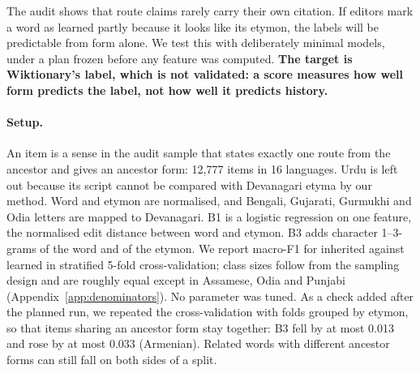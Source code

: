 \documentclass[11pt]{article}
\begin{document}
The audit shows that route claims rarely carry their own citation. If editors mark a word as learned partly because it looks like its etymon, the labels will be predictable from form alone. We test this with deliberately minimal models, under a plan frozen before any feature was computed. \textbf{The target is Wiktionary's label, which is not validated: a score measures how well form predicts the label, not how well it predicts history.}

\paragraph{Setup.} An item is a sense in the audit sample that states exactly one route from the ancestor and gives an ancestor form: 12,777 items in 16 languages. Urdu is left out because its script cannot be compared with Devanagari etyma by our method. Word and etymon are normalised, and Bengali, Gujarati, Gurmukhi and Odia letters are mapped to Devanagari. B1 is a logistic regression on one feature, the normalised edit distance between word and etymon. B3 adds character 1--3-grams of the word and of the etymon. We report macro-F1 for inherited against learned in stratified 5-fold cross-validation; class sizes follow from the sampling design and are roughly equal except in Assamese, Odia and Punjabi (Appendix~\ref{app:denominators}). No parameter was tuned. As a check added after the planned run, we repeated the cross-validation with folds grouped by etymon, so that items sharing an ancestor form stay together: B3 fell by at most 0.013 and rose by at most 0.033 (Armenian). Related words with different ancestor forms can still fall on both sides of a split.
\end{document}
